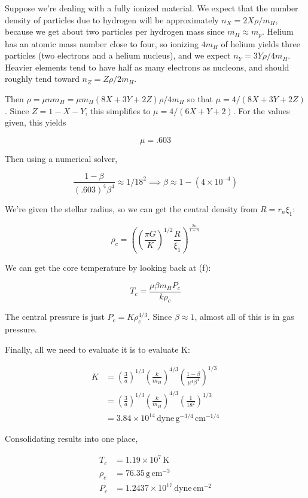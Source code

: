 \documentclass[12pt]{article}
\newcommand{\pfrac}[2]{\left(\frac{#1}{#2} \right)}
\begin{document}
Suppose we're dealing with a fully ionized material. We expect that the number density of particles due to hydrogen will be approximately \(n_X = 2X\rho/m_H\), because we get about two particles per hydrogen mass since \(m_H \approx m_p\). Helium has an atomic mass number close to four, so ionizing \(4m_H\) of helium yields three particles (two electrons and a helium nucleus), and we expect \(n_Y = 3Y\rho/4m_H\). Heavier elements tend to have half as many electrons as nucleons, and should roughly tend toward \(n_Z = Z\rho/2m_H\).

Then \(\rho = \mu n m_H  = \mu m_H (8X +3Y + 2Z)\rho/4m_H\) so that \(\mu = 4/(8X+3Y+2Z)\). Since \(Z=1-X-Y\), this simplifies to \(\mu=4/(6X+Y+2)\). For the values given, this yields

\[\mu = .603\]

Then using a numerical solver,

\[ \frac{1-\beta}{(.603)^4 \beta^4} \approx 1/18^2 \implies \beta \approx 1 - (4 \times 10^{-4})
\]


We're given the stellar radius, so we can get the central density from \(R = r_n \xi_1\):

\[ \rho_c = \left( \pfrac{\pi G}{K}^{1/2} \frac{R}{\xi_1}  \right) ^ {\frac{2n}{1-n}}
\]



We can get the core temperature by looking back at (f):

\[ T_c = \frac{\mu \beta m_H P_c}{k\rho_c}
\]

The central pressure is just \(P_c = K \rho_c^{4/3}\). Since \(\beta\approx 1\), almost all of this is in gas pressure.

Finally, all we need to evaluate it is to evaluate K:

\begin{align*}
K &= \pfrac{3}{a}^{1/3} \pfrac{k}{m_H}^{4/3} \pfrac{1-\beta}{\mu^4 \beta^4}^{1/3} \\[7pt]
&= \pfrac{3}{a}^{1/3} \pfrac{k}{m_H}^{4/3} \pfrac{1}{18^2}^{1/3} \\[7pt]
&= 3.84 \times 10^{14} \, \mathrm{dyne} \, \mathrm{g}^{-3/4} \,\mathrm{cm}^{-1/4}
\end{align*}

Consolidating results into one place,

\begin{align*}
T_c &= 1.19 \times 10^{7} \, \mathrm{K} \\
\rho_c &= 76.35 \, \mathrm{g}\,\mathrm{cm}^{-3} \\
P_c &= 1.2437 \times 10^{17} \, \mathrm{dyne} \, \mathrm{cm}^{-2}
\end{align*}
\end{document}
